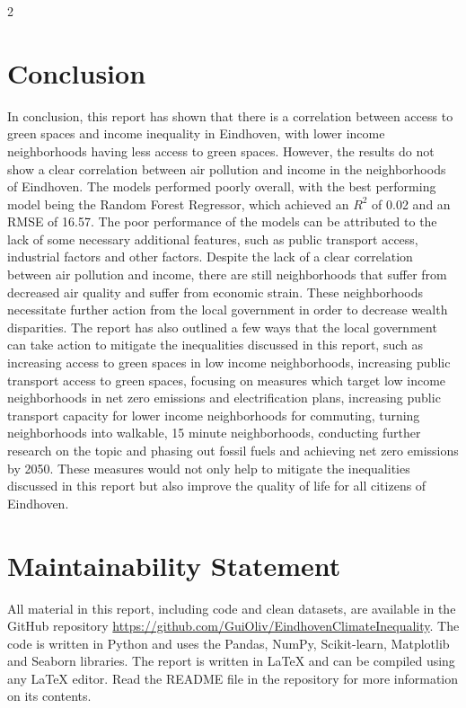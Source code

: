 \documentclass[12pt, a4paper]{article}
\begin{document}
\begin{multicols}{2}
    \section{Conclusion}
    In conclusion, this report has shown that there is a correlation between access to green spaces and income inequality in Eindhoven, with lower income neighborhoods having less access to green spaces. However, the results do not show a clear correlation between air pollution and income in the neighborhoods of Eindhoven. The models performed poorly overall, with the best performing model being the Random Forest Regressor, which achieved an $R^2$ of 0.02 and an RMSE of 16.57. The poor performance of the models can be attributed to the lack of some necessary additional features, such as public transport access, industrial factors and other factors.
    Despite the lack of a clear correlation between air pollution and income, there are still neighborhoods that suffer from decreased air quality and suffer from economic strain. These neighborhoods necessitate further action from the local government in order to decrease wealth disparities.
    The report has also outlined a few ways that the local government can take action to mitigate the inequalities discussed in this report, such as increasing access to green spaces in low income neighborhoods, increasing public transport access to green spaces, focusing on measures which target low income neighborhoods in net zero emissions and electrification plans, increasing public transport capacity for lower income neighborhoods for commuting, turning neighborhoods into walkable, 15 minute neighborhoods, conducting further research on the topic and phasing out fossil fuels and achieving net zero emissions by 2050.
    These measures would not only help to mitigate the inequalities discussed in this report but also improve the quality of life for all citizens of Eindhoven. 

    \section{Maintainability Statement}
    All material in this report, including code and clean datasets, are available in the GitHub repository \url{https://github.com/GuiOliv/EindhovenClimateInequality}. The code is written in Python and uses the Pandas, NumPy, Scikit-learn, Matplotlib and Seaborn libraries. The report is written in LaTeX and can be compiled using any LaTeX editor.
    Read the README file in the repository for more information on its contents.
\end{multicols}
\end{document}
